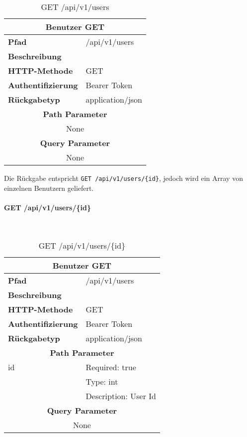 \begin{table}[H]
  \centering
  \begin{tabular}{|l|l|}
  \hline
  \multicolumn{2}{|c|}{\textbf{Benutzer GET}} \\ \hline
  \textbf{Pfad}                & /api/v1/users  \\ \hline
  \textbf{Beschreibung}        &                     \\ \hline
  \textbf{HTTP-Methode}        & GET                 \\ \hline
  \textbf{Authentifizierung}   & Bearer Token        \\ \hline
  \textbf{Rückgabetyp}         & application/json    \\ \hline
  \multicolumn{2}{|c|}{\textbf{Path Parameter}}                      \\ \hline
  \multicolumn{2}{|c|}{None}          \\ \hline
  \multicolumn{2}{|c|}{\textbf{Query Parameter}}                      \\ \hline
  \multicolumn{2}{|c|}{None}          \\ \hline
  \end{tabular}
  \caption{GET /api/v1/users}
\end{table}

Die Rückgabe entspricht \verb|GET /api/v1/users/{id}|, jedoch wird ein
Array von einzelnen Benutzern geliefert.

\paragraph{GET /api/v1/users/\{id\}}\mbox{}\\

\begin{table}[H]
  \centering
  \begin{tabular}{|l|l|}
  \hline
  \multicolumn{2}{|c|}{\textbf{Benutzer GET}}         \\ \hline
  \textbf{Pfad}              & /api/v1/users        \\ \hline
  \textbf{Beschreibung}      &                           \\ \hline
  \textbf{HTTP-Methode}      & GET                       \\ \hline
  \textbf{Authentifizierung} & Bearer Token              \\ \hline
  \textbf{Rückgabetyp}       & application/json          \\ \hline
  \multicolumn{2}{|c|}{\textbf{Path Parameter}}          \\ \hline
  id                         & Required: true            \\ \hline
                             & Type: int                 \\ \hline
                             & Description: User Id \\ \hline
  \multicolumn{2}{|c|}{\textbf{Query Parameter}}                      \\ \hline
  \multicolumn{2}{|c|}{None}          \\ \hline
  \end{tabular}
  \caption{GET /api/v1/users/\{id\}}
\end{table}

